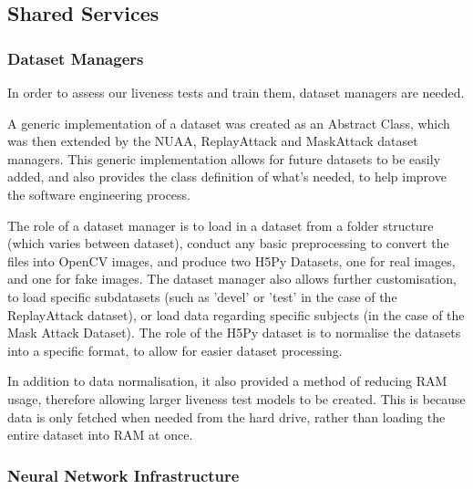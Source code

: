 \documentclass[11pt,a4paper]{article}
\begin{document}

    \subsection{Shared Services}
        \subsubsection{Dataset Managers}
        In order to assess our liveness tests and train them, dataset managers are needed.

        A generic implementation of a dataset was created as an Abstract Class, which was then extended by the NUAA, ReplayAttack and MaskAttack dataset managers.
        This generic implementation allows for future datasets to be easily added, and also provides the class definition of what's needed, to help improve the software engineering process.

        The role of a dataset manager is to load in a dataset from a folder structure (which varies between dataset), conduct any basic preprocessing to convert the files into OpenCV images,
        and produce two H5Py Datasets, one for real images, and one for fake images. The dataset manager also allows further customisation, to load specific subdatasets (such as 'devel' or 'test' in the case
        of the ReplayAttack dataset), or load data regarding specific subjects (in the case of the Mask Attack Dataset). The role of the H5Py dataset is to normalise the datasets into a specific format,
        to allow for easier dataset processing.

        In addition to data normalisation, it also provided a method of reducing RAM usage, therefore allowing larger liveness test models to be created. This is because data is only fetched when needed
        from the hard drive, rather than loading the entire dataset into RAM at once.


        \subsubsection{Neural Network Infrastructure}
            
\end{document}
